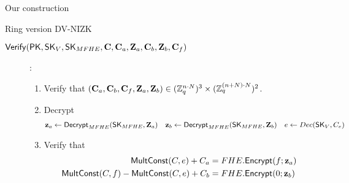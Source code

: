 \begin{section}{Our construction}
\begin{subsection}{Ring version DV-NIZK}
\begin{description}
    \item[${\mathsf{Verify}}(\mathsf{PK}, \mathsf{SK}_{V}, \mathsf{SK}_{MFHE}, \mathbf{C}, \mathbf{C}_a, \mathbf{Z}_a, \mathbf{C}_b, \mathbf{Z}_b, \mathbf{C}_f)$]:
      \begin{enumerate}
      \item Verify that $(\mathbf{C}_a, \mathbf{C}_b, \mathbf{C}_f, \mathbf{Z}_a, \mathbf{Z}_b) \in (\mathbb{Z}_q^{n \cdot N})^3 \times (\mathbb{Z}_q^{(n+N)\cdot N})^2$.
      \item Decrypt
        \begin{align*}
          \mathbf{z}_a &\gets {\mathsf{Decrypt}}_{MFHE}(\mathsf{SK}_{MFHE}, \mathbf{Z}_a) & \mathbf{z}_b &\gets {\mathsf{Decrypt}}_{MFHE}(\mathsf{SK}_{MFHE}, \mathbf{Z}_b) & e &\gets Dec(\mathsf{SK}_{V}, C_e)
        \end{align*}
        
      \item Verify that
        \begin{align*}
          {\mathsf{MultConst}}(C, e)+C_a &= FHE.{\mathsf{Encrypt}}(f; \mathbf{z}_a) \\
          {\mathsf{MultConst}}(C, f) - {\mathsf{MultConst}}(C, e) + C_b &= FHE.{\mathsf{Encrypt}}(0; \mathbf{z}_b)
        \end{align*}
      \end{enumerate}
    \end{description}
    
\end{subsection}


\end{section}
